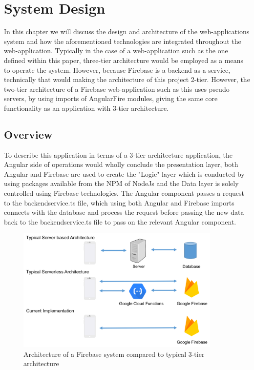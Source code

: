 \chapter{System Design}
In this chapter we will discuss the design and architecture of the web-applications system and how the aforementioned technologies are integrated throughout the web-application. Typically in the case of a web-application such as the one defined within this paper, three-tier architecture would be employed as a means to operate the system. However, because Firebase is a backend-as-a-service, technically that would making the architecture of this project 2-tier. However, the two-tier architecture of a Firebase web-application such as this uses pseudo servers, by using imports of AngularFire modules, giving the same core functionality as an application with 3-tier architecture. 

\section{Overview}
To describe this application in terms of a 3-tier architecture application, the Angular side of operations would wholly conclude the presentation layer, both Angular and Firebase are used to create the "Logic" layer which is conducted by using packages available from the NPM of NodeJs and the Data layer is solely controlled using Firebase technologies. The Angular component passes a request to the backendservice.ts file, which using both Angular and Firebase imports connects with the database and process the request before passing the new data back to the backendservice.ts file to pass on the relevant Angular component.
\newpage
\begin{figure}[h!]
    	\caption{Architecture of a Firebase system compared to typical 3-tier architecture}
	\centering
	\includegraphics[width=0.9\textwidth]{images/architecture.png}
\end{figure}


